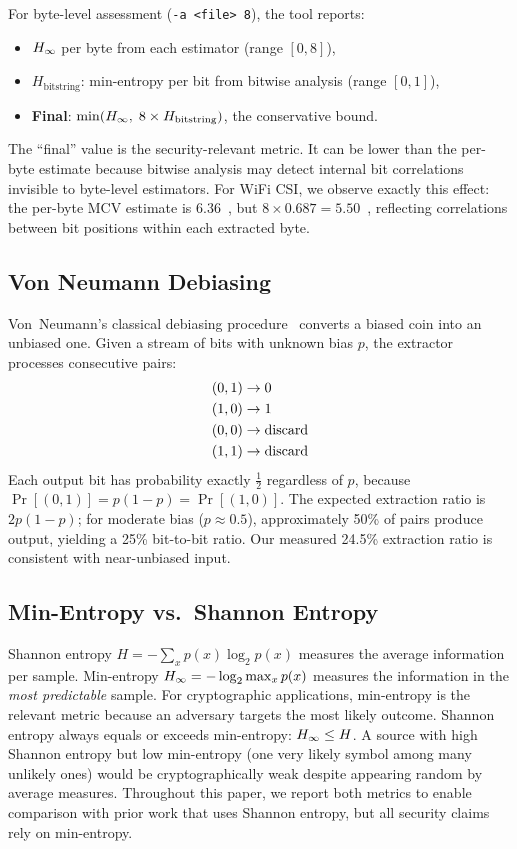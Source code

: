 For byte-level assessment (\texttt{-a <file> 8}), the tool reports:
\begin{itemize}
\item $H_{\infty}$ per byte from each estimator (range $[0, 8]$),
\item $H_{\text{bitstring}}$: min-entropy per bit from bitwise analysis (range $[0, 1]$),
\item \textbf{Final}: $\min(H_{\infty}, \; 8 \times H_{\text{bitstring}})$, the conservative bound.
\end{itemize}

The ``final'' value is the security-relevant metric.
It can be lower than the per-byte estimate because bitwise analysis may detect internal bit correlations invisible to byte-level estimators.
For WiFi CSI, we observe exactly this effect: the per-byte MCV estimate is 6.36~\bpb, but $8 \times 0.687 = 5.50$~\bpb, reflecting correlations between bit positions within each extracted byte.

\subsection{Von Neumann Debiasing}
\label{subsec:vonneumann}

Von~Neumann's classical debiasing procedure~\cite{vonneumann1951various} converts a biased coin into an unbiased one.
Given a stream of bits with unknown bias $p$, the extractor processes consecutive pairs:
\begin{align}
(0,1) &\to 0 \notag \\
(1,0) &\to 1 \notag \\
(0,0) &\to \text{discard} \notag \\
(1,1) &\to \text{discard}
\label{eq:vonneumann}
\end{align}
Each output bit has probability exactly $\frac{1}{2}$ regardless of $p$, because $\Pr[(0,1)] = p(1-p) = \Pr[(1,0)]$.
The expected extraction ratio is $2p(1-p)$; for moderate bias ($p \approx 0.5$), approximately 50\% of pairs produce output, yielding a 25\% bit-to-bit ratio.
Our measured 24.5\% extraction ratio is consistent with near-unbiased input.

\subsection{Min-Entropy vs.\ Shannon Entropy}
\label{subsec:minentropy-vs-shannon}

Shannon entropy $H = -\sum_x p(x) \log_2 p(x)$ measures the average information per sample.
Min-entropy $H_{\infty} = -\log_2 \max_x p(x)$ measures the information in the \emph{most predictable} sample.
For cryptographic applications, min-entropy is the relevant metric because an adversary targets the most likely outcome.
Shannon entropy always equals or exceeds min-entropy: $H_{\infty} \leq H$.
A source with high Shannon entropy but low min-entropy (one very likely symbol among many unlikely ones) would be cryptographically weak despite appearing random by average measures.
Throughout this paper, we report both metrics to enable comparison with prior work that uses Shannon entropy, but all security claims rely on min-entropy.


